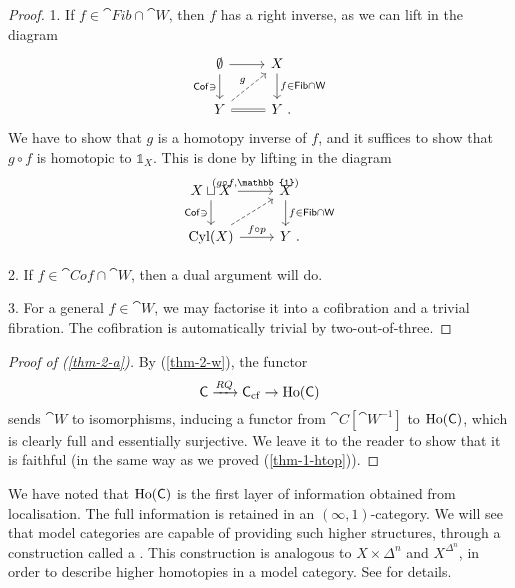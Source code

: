 \begin{proof}
    1. If $f \in \cat{Fib}\cap\cat{W}$,
    then $f$ has a right inverse, as we can lift in the diagram 
    \[ \begin{tikzcd}
        \emptyset \ar[r] \ar[d,"\cat{Cof}\ni"'] &
        X \ar[d,"f\in\cat{Fib}\cap\cat{W}"] \\
        Y \ar[ur,dashed,"g"] \ar[r,equals] & Y \rlap{\ .}
    \end{tikzcd} \]
    We have to show that $g$ is a homotopy inverse of $f$,
    and it suffices to show that $g\circ f$ is homotopic to $\mathbb{1}_X$.
    This is done by lifting in the diagram 
    \[ \begin{tikzcd}
        X\sqcup X \ar[r,"(g\circ f\comma\mathbb{1})"] \ar[d,"\cat{Cof}\ni"'] &
        X \ar[d,"f\in\cat{Fib}\cap\cat{W}"] \\
        \operatorname{Cyl}(X) \ar[ur,dashed] \ar[r,"f\circ p"] & Y\rlap{\ .}
    \end{tikzcd} \]

    2. If $f \in \cat{Cof}\cap\cat{W}$,
    then a dual argument will do.

    3. For a general $f\in\cat{W}$,
    we may factorise it into a cofibration and a trivial fibration.
    The cofibration is automatically trivial by two-out-of-three.
\end{proof}

\begin{proof}[Proof of \textup{(\ref{thm-2-a})}]
    By (\ref{thm-2-w}), the functor 
    \[ \mathsf{C} \xrightarrow{RQ} \mathsf{C}_{\mathrm{cf}} \to \operatorname{Ho}(\mathsf{C}) \]
    sends $\cat{W}$ to isomorphisms, inducing a functor
    from $\cat{C}[\cat W^{-1}]$ to $\operatorname{Ho}(\mathsf{C})$,
    which is clearly full and essentially surjective.
    We leave it to the reader to show that it is faithful
    (in the same way as we proved (\ref{thm-1-htop})).
\end{proof}

\begin{remark}
    We have noted that $\operatorname{Ho}(\mathsf{C})$
    is the first layer of information obtained from localisation.
    The full information is retained in an $(\infty,1)$-category.
    We will see that model categories are capable of providing
    such higher structures,
    through a construction called a .
    This construction is analogous to $X\times\Delta^n$ and $X^{\Delta^n}$,
    in order to describe higher homotopies in a model category.
    See \cite[Chapter~5]{hovey} for details. \varqed
\end{remark}

